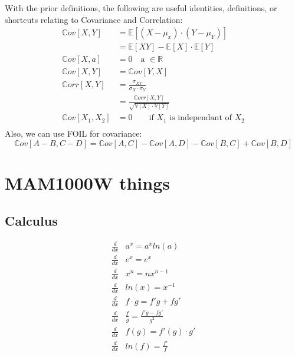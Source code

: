 With the prior definitions, the following are useful identities, definitions,
or shortcuts relating to Covariance and Correlation:
\begin{equation*}
    \begin{aligned}
        \mathbb{C}ov[X, Y] &= \mathbb{E}[(X - \mu_x)\cdot(Y - \mu_Y)] \\
                  &= \mathbb{E}[XY] - \mathbb{E}[X] \cdot \mathbb{E}[Y] \\
        \mathbb{C}ov[X, a] &= 0 \quad \text{a } \in \mathbb{R} \\
        \mathbb{C}ov[X, Y] &= \mathbb{C}ov[Y, X] \\
        \mathbb{C}orr[X, Y] &= \frac{\sigma_{XY}}{\sigma_X \cdot \sigma_Y}\\
            &= \frac{ \mathbb{C}orr[X, Y] }{ \sqrt{ \mathbb{V}[X] \cdot \mathbb{V}[Y] }} \\
        \mathbb{C}ov[X_1, X_2] &= 0 \qquad \text{if $X_1$ is independant of
        $X_2$}\\
    \end{aligned}
\end{equation*}
Also, we can use FOIL for covariance:
\begin{equation*}
    \mathbb{C}ov\left[A - B, C - D\right] = \mathbb{C}ov\left[A, C\right] -
    \mathbb{C}ov\left[A, D\right] - \mathbb{C}ov\left[B, C\right] +
    \mathbb{C}ov\left[B, D\right] 
\end{equation*}
    

\section{MAM1000W things}
\subsection{Calculus}
\begin{equation*}
    \begin{aligned}
        \frac{d}{dx} & a^x = a^x ln(a) \\
        \frac{d}{dx} & e^x = e^x  \\
        \frac{d}{dx} & x^n = nx^{n-1} \\
        \frac{d}{dx} & ln(x) = x^{-1} \\
        \frac{d}{dx} & f \cdot g = f'g + fg' \\
        \frac{d}{dx} & \frac{f}{g} = \frac{f'g - fg'}{g^2} \\
        \frac{d}{dx} & f(g) = f'(g) \cdot g' \\
        \frac{d}{dx} & ln(f) = \frac{f'}{f} \\
    \end{aligned}
\end{equation*}

